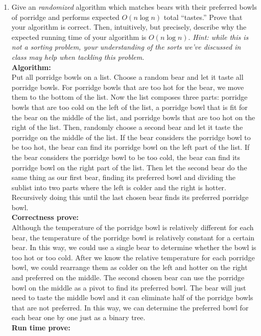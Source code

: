 \documentclass[10pt]{article}
\begin{document}
\begin{enumerate}
    \item Give an {\em randomized} algorithm which matches bears with their preferred bowls of porridge and performs expected $O(n \log n)$ total ``tastes.'' Prove that your algorithm is correct. Then, intuitively, but precisely, describe why the expected running time of your algorithm is $O(n \log n)$. {\em Hint: while this is not a sorting problem, your understanding of the sorts we've discussed in class may help when tackling this problem.}\\
    \textbf{Algorithm:}\\
    Put all porridge bowls on a list. Choose a random bear and let it taste all porridge bowls. For porridge bowls that are too hot for the bear, we move them to the bottom of the list. Now the list composes three parts: porridge bowls that are too cold on the left of the list, a porridge bowl that is fit for the bear on the middle of the list, and porridge bowls that are too hot on the right of the list. Then, randomly choose a second bear and let it taste the porridge on the middle of the list. If the bear considers the porridge bowl to be too hot, the bear can find its porridge bowl on the left part of the list. If the bear considers the porridge bowl to be too cold, the bear can find its porridge bowl on the right part of the list. Then let the second bear do the same thing as our first bear, finding its preferred bowl and dividing the sublist into two parts where the left is colder and the right is hotter. Recursively doing this until the last chosen bear finds its preferred porridge bowl.\\
    \textbf{Correctness prove:}\\
    Although the temperature of the porridge bowl is relatively different for each bear, the temperature of the porridge bowl is relatively constant for a certain bear. In this way, we could use a single bear to determine whether the bowl is too hot or too cold. After we know the relative temperature for each porridge bowl, we could rearrange them as colder on the left and hotter on the right and preferred on the middle. The second chosen bear can use the porridge bowl on the middle as a pivot to find its preferred bowl. The bear will just need to taste the middle bowl and it can eliminate half of the porridge bowls that are not preferred. In this way, we can determine the preferred bowl for each bear one by one just as a binary tree.\\
    \textbf{Run time prove:}\\

\end{enumerate}
\end{document}
